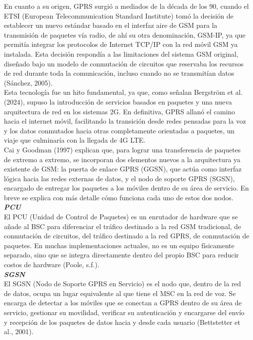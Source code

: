 \documentclass[12pt,a4paper]{article}
\begin{document}
	En cuanto a su origen, GPRS surgió a mediados de la década de los 90, cuando el ETSI (European Telecommunication Standard Institute) tomó la decisión de establecer un nuevo estándar basado en el interfaz aire de GSM para la transmisión de paquetes vía radio, de ahí su otra denominación, GSM-IP, ya que permitía integrar los protocolos de Internet TCP/IP con la red móvil GSM ya instalada. Esta decisión respondía a las limitaciones del sistema GSM original, diseñado bajo un modelo de conmutación de circuitos que reservaba los recursos de red durante toda la comunicación, incluso cuando no se transmitían datos (Sánchez, 2005). \\
	
	Esta tecnología fue un hito fundamental, ya que, como señalan Bergström et al. (2024), supuso la introducción de servicios basados en paquetes y una nueva arquitectura de red en los sistemas 2G. En definitiva, GPRS allanó el camino hacia el internet móvil, facilitando la transición desde redes pensadas para la voz y los datos conmutados hacia otras completamente orientadas a paquetes, un viaje que culminaría con la llegada de 4G LTE. \\
	
	Cai y Goodman (1997) explican que, para lograr una transferencia de paquetes de extremo a extremo, se incorporan dos elementos nuevos a la arquitectura ya existente de GSM: la puerta de enlace GPRS (GGSN), que actúa como interfaz lógica hacia las redes externas de datos, y el nodo de soporte GPRS (SGSN), encargado de entregar los paquetes a los móviles dentro de su área de servicio. En breve se explica con más detalle cómo funciona cada uno de estos dos nodos. \\
	
	\textbf{\textit{	PCU}} \mbox{}\\
	
	El PCU (Unidad de Control de Paquetes) es un enrutador de hardware que se añade al BSC para diferenciar el tráfico destinado a la red GSM tradicional, de conmutación de circuitos, del tráfico destinado a la red GPRS, de conmutación de paquetes. En muchas implementaciones actuales, no es un equipo físicamente separado, sino que se integra directamente dentro del propio BSC para reducir costos de hardware (Poole, s.f.). \\
	
	\textbf{\textit{	SGSN}} \mbox{}\\
	
	El SGSN (Nodo de Soporte GPRS en Servicio) es el nodo que, dentro de la red de datos, ocupa un lugar equivalente al que tiene el MSC en la red de voz. Se encarga de detectar a los móviles que se conectan a GPRS dentro de su área de servicio, gestionar su movilidad, verificar su autenticación y encargarse del envío y recepción de los paquetes de datos hacia y desde cada usuario (Bettstetter et al., 2001). \\
	
\end{document}
